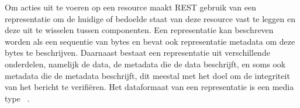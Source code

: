 Om acties uit te voeren op een resource maakt REST gebruik van een representatie om de huidige of bedoelde staat van deze resource vast te leggen en deze uit te wisselen tussen componenten. Een representatie kan beschreven worden als een sequentie van bytes en bevat ook representatie metadata om deze bytes te beschrijven. Daarnaast bestaat een representatie uit verschillende onderdelen, namelijk de data, de metadata die de data beschrijft, en soms ook metadata die de metadata beschrijft, dit meestal met het doel om de integriteit van het bericht te verifiëren. Het dataformaat van een representatie is een media type ~\autocite{N.Freed1996}.




